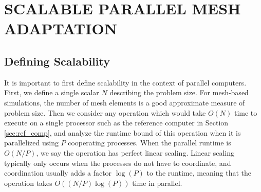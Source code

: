 
\chapter{SCALABLE PARALLEL MESH ADAPTATION}
\label{chap:parallel}
\nocite{ibanez2016pumi}
\nocite{ibanez2016hybrid}
\nocite{ibanez2016mesh}

\section{Defining Scalability}
\label{sec:scalable}

It is important to first define scalability in the context of
parallel computers.
First, we define a single scalar $N$ describing the problem size.
For mesh-based simulations, the number of mesh elements
is a good approximate measure of problem size.
Then we consider any operation which would take $O(N)$ time to execute
on a single processor such as the reference computer
in Section \ref{sec:ref_comp}, and analyze the runtime bound
of this operation when it is parallelized using $P$ cooperating processes.
When the parallel runtime is $O(N/P)$, we say the operation
has perfect linear scaling.
Linear scaling typically only occurs when the processes do not have to coordinate,
and coordination usually adds a factor $\log(P)$ to the runtime,
meaning that the operation takes $O((N/P)\log(P))$ time in parallel.

